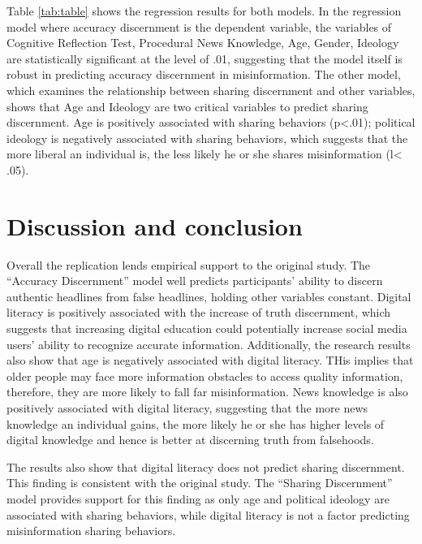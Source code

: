 \documentclass[
]{article}
\begin{document}
Table \label{tab:table} \ref{tab:table} shows the regression results for both models. In the regression model where accuracy discernment is the dependent variable, the variables of Cognitive Reflection Test, Procedural News Knowledge, Age, Gender, Ideology are statistically significant at the level of .01, suggesting that the model itself is robust in predicting accuracy discernment in misinformation.
The other model, which examines the relationship between sharing discernment and other variables, shows that Age and Ideology are two critical variables to predict sharing discernment. Age is positively associated with sharing behaviors (p\textless.01); political ideology is negatively associated with sharing behaviors, which suggests that the more liberal an individual is, the less likely he or she shares misinformation (l\textless{} .05).

\hypertarget{discussion-and-conclusion}{%
\section{Discussion and conclusion}\label{discussion-and-conclusion}}

Overall the replication lends empirical support to the original study. The ``Accuracy Discernment'' model well predicts participants' ability to discern authentic headlines from false headlines, holding other variables constant. Digital literacy is positively associated with the increase of truth discernment, which suggests that increasing digital education could potentially increase social media users' ability to recognize accurate information. Additionally, the research results also show that age is negatively associated with digital literacy. THis implies that older people may face more information obstacles to access quality information, therefore, they are more likely to fall far misinformation. News knowledge is also positively associated with digital literacy, suggesting that the more news knowledge an individual gains, the more likely he or she has higher levels of digital knowledge and hence is better at discerning truth from falsehoods.

The results also show that digital literacy does not predict sharing discernment. This finding is consistent with the original study. The ``Sharing Discernment'' model provides support for this finding as only age and political ideology are associated with sharing behaviors, while digital literacy is not a factor predicting misinformation sharing behaviors.
\end{document}
